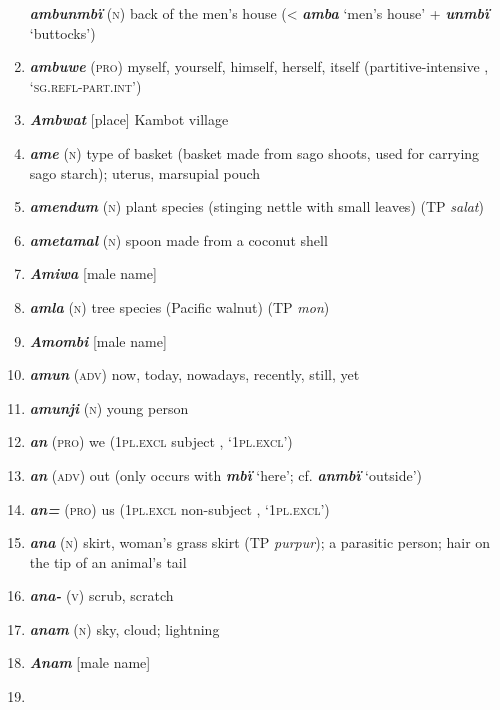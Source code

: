 \begin{enumerate}[noitemsep, label={}, align=left, widest=190, labelsep=1ex,leftmargin=*,itemindent=-10pt]
\textbf{\textit{ambunmbï}} (\textsc{n}) back of the men’s house (< \textbf{\textit{amba}} ‘men’s house’ + \textbf{\textit{unmbï}} \linebreak ‘buttocks’) \item 
\textbf{\textit{ambuwe}} (\textsc{pro}) myself, yourself, himself, herself, itself (partitive-intensive \linebreak {}  , ‘\textsc{sg.refl-part.int}’) \item 
\textbf{\textit{Ambwat}} [place] Kambot village \item 
\textbf{\textit{ame}} (\textsc{n}) type of basket (basket made from sago shoots, used for carrying sago \linebreak starch); uterus, marsupial pouch \item 
\textbf{\textit{amendum}} (\textsc{n}) plant species (stinging nettle with small leaves) (TP \textit{salat}) \item 
\textbf{\textit{ametamal}} (\textsc{n}) spoon made from a coconut shell \item 
\textbf{\textit{Amiwa}} [male name] \item 
\textbf{\textit{amla}} (\textsc{n}) tree species (Pacific walnut) (TP \textit{mon}) \item 
\textbf{\textit{Amombi}} [male name] \item 
\textbf{\textit{amun}} (\textsc{adv}) now, today, nowadays, recently, still, yet \item 
\textbf{\textit{amunji}} (\textsc{n}) young person \item 
\textbf{\textit{an}} (\textsc{pro}) we (\textsc{1pl.excl} subject , ‘\textsc{1pl.excl}’) \item 
\textbf{\textit{an}} (\textsc{adv}) out (only occurs with \textbf{\textit{mbï}} ‘here’; cf. \textbf{\textit{anmbï}} ‘outside’) \item 
\textbf{\textit{an=}} (\textsc{pro}) us (\textsc{1pl.excl} non-subject , ‘\textsc{1pl.excl}’) \item 
\textbf{\textit{ana}} (\textsc{n}) skirt, woman’s grass skirt (TP \textit{purpur}); a parasitic person; hair on the tip of an animal’s tail \item 
\textbf{\textit{ana-}} (\textsc{v}) scrub, scratch \item 
\textbf{\textit{anam}} (\textsc{n}) sky, cloud; lightning \item 
\textbf{\textit{Anam}} [male name] \item 

\end{enumerate}
